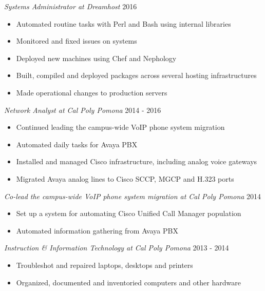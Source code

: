 \documentclass[line]{docs/resume/res}
\begin{document}
\begin{resume}
  \vspace{0.1in} %

  {\sl Systems Administrator at Dreamhost} \hfill 2016
  \begin{itemize} \itemsep -2pt
    \item Automated routine tasks with Perl and Bash using internal libraries
    \item Monitored and fixed issues on systems
    \item Deployed new machines using Chef and Nephology
    \item Built, compiled and deployed packages across several hosting infrastructures
    \item Made operational changes to production servers
  \end{itemize}

  {\sl Network Analyst at Cal Poly Pomona} \hfill 2014 - 2016
  \begin{itemize} \itemsep -2pt
    \item Continued leading the campus-wide VoIP phone system migration
    \item Automated daily tasks for Avaya PBX
    \item Installed and managed Cisco infrastructure, including analog voice gateways
    \item Migrated Avaya analog lines to Cisco SCCP, MGCP and H.323 ports
  \end{itemize}

  {\sl Co-lead the campus-wide VoIP phone system migration at Cal Poly Pomona} \hfill 2014
  \begin{itemize} \itemsep -2pt
    \item Set up a system for automating Cisco Unified Call Manager population
    \item Automated information gathering from Avaya PBX
  \end{itemize}

  {\sl Instruction \& Information Technology at Cal Poly Pomona} \hfill 2013 - 2014
  \begin{itemize} \itemsep -2pt
    \item Troubleshot and repaired laptops, desktops and printers
    \item Organized, documented and inventoried computers and other hardware
  \end{itemize}


\end{resume}
\end{document}
